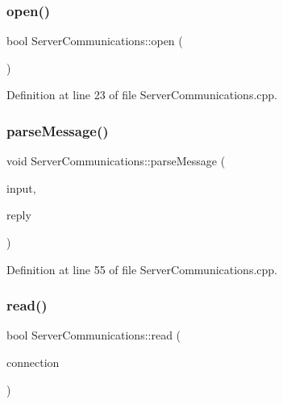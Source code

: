 \subsubsection{\texorpdfstring{open()}{open()}}
{\footnotesize\ttfamily bool Server\+Communications\+::open (\begin{DoxyParamCaption}{ }\end{DoxyParamCaption})}



Definition at line 23 of file Server\+Communications.\+cpp.

\hypertarget{classocra__recipes_1_1ServerCommunications_a66c219902af82f3edb98652c31093c45}{}\label{classocra__recipes_1_1ServerCommunications_a66c219902af82f3edb98652c31093c45} 
\subsubsection{\texorpdfstring{parse\+Message()}{parseMessage()}}
{\footnotesize\ttfamily void Server\+Communications\+::parse\+Message (\begin{DoxyParamCaption}\item[{yarp\+::os\+::\+Bottle \&}]{input,  }\item[{yarp\+::os\+::\+Bottle \&}]{reply }\end{DoxyParamCaption})}



Definition at line 55 of file Server\+Communications.\+cpp.

\hypertarget{classocra__recipes_1_1ServerCommunications_a3a3430656af5150bb28b2012c3cd7004}{}\label{classocra__recipes_1_1ServerCommunications_a3a3430656af5150bb28b2012c3cd7004} 
\subsubsection{\texorpdfstring{read()}{read()}}
{\footnotesize\ttfamily bool Server\+Communications\+::read (\begin{DoxyParamCaption}\item[{yarp\+::os\+::\+Connection\+Reader \&}]{connection }\end{DoxyParamCaption})\hspace{0.3cm}{\ttfamily [virtual]}}



